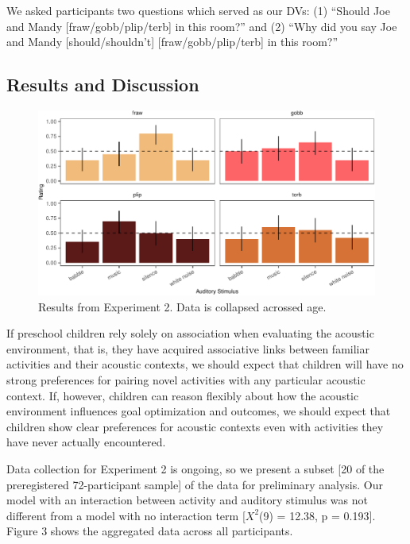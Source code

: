 \documentclass[10pt, letterpaper]{article}
\newenvironment{CodeChunk}{}{}
\begin{document}
We asked participants two questions which served as our DVs: (1)
``Should Joe and Mandy {[}fraw/gobb/plip/terb{]} in this room?'' and (2)
``Why did you say Joe and Mandy {[}should/shouldn't{]}
{[}fraw/gobb/plip/terb{]} in this room?''

\hypertarget{results-and-discussion-1}{%
\subsection{Results and Discussion}\label{results-and-discussion-1}}

\begin{CodeChunk}
\begin{figure}[t]

{\centering \includegraphics{figs/e4b-bar-1} 

}

\caption[Results from Experiment 2]{Results from Experiment 2. Data is collapsed acrossed age.}\label{fig:e4b-bar}
\end{figure}
\end{CodeChunk}

If preschool children rely solely on association when evaluating the
acoustic environment, that is, they have acquired associative links
between familiar activities and their acoustic contexts, we should
expect that children will have no strong preferences for pairing novel
activities with any particular acoustic context. If, however, children
can reason flexibly about how the acoustic environment influences goal
optimization and outcomes, we should expect that children show clear
preferences for acoustic contexts even with activities they have never
actually encountered.

Data collection for Experiment 2 is ongoing, so we present a subset
{[}20 of the preregistered 72-participant sample{]} of the data for
preliminary analysis. Our model with an interaction between activity and
auditory stimulus was not different from a model with no interaction
term {[}\(X^2\)(9) = 12.38, p = 0.193{]}. Figure 3 shows the aggregated
data across all participants.
\end{document}

